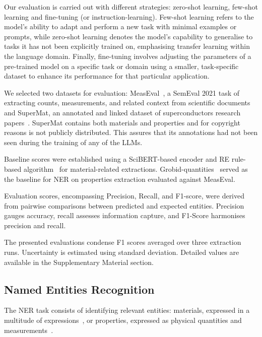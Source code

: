 \documentclass[a4paper]{article}
\begin{document}
Our evaluation is carried out with different strategies: zero-shot learning, few-shot learning and fine-tuning (or instruction-learning).  
Few-shot learning refers to the model's ability to adapt and perform a new task with minimal examples or prompts, while zero-shot learning denotes the model's capability to generalise to tasks it has not been explicitly trained on, emphasising transfer learning within the language domain.
Finally, fine-tuning involves adjusting the parameters of a pre-trained model on a specific task or domain using a smaller, task-specific dataset to enhance its performance for that particular application.

We selected two datasets for evaluation: MeasEval~\cite{harper2021semeval2021}, a SemEval 2021 task of extracting counts, measurements, and related context from scientific documents and SuperMat, an annotated and linked dataset of superconductors research papers~\cite{lfoppiano2021supermat}. 
SuperMat contains both materials and properties and for copyright reasons is not publicly distributed. 
This assures that its annotations had not been seen during the training of any of the LLMs.

Baseline scores were established using a SciBERT-based encoder and RE rule-based algorithm~\cite{lfoppiano2023automatic} for material-related extractions. Grobid-quantities~\cite{foppiano2019quantities} served as the baseline for NER on properties extraction evaluated against MeasEval.

Evaluation scores, encompassing Precision, Recall, and F1-score, were derived from pairwise comparisons between predicted and expected entities. Precision gauges accuracy, recall assesses information capture, and F1-Score harmonises precision and recall.

The presented evaluations condense F1 scores averaged over three extraction runs. Uncertainty is estimated using standard deviation. 
Detailed values are available in the Supplementary Material section.

\subsection{Named Entities Recognition}
\label{sec:ner}
The NER task consists of identifying relevant entities: materials, expressed in a multitude of expressions~\cite{lfoppiano2021supermat}, or properties, expressed as physical quantities and measurements~\cite{foppiano2019quantities}. 
\end{document}

